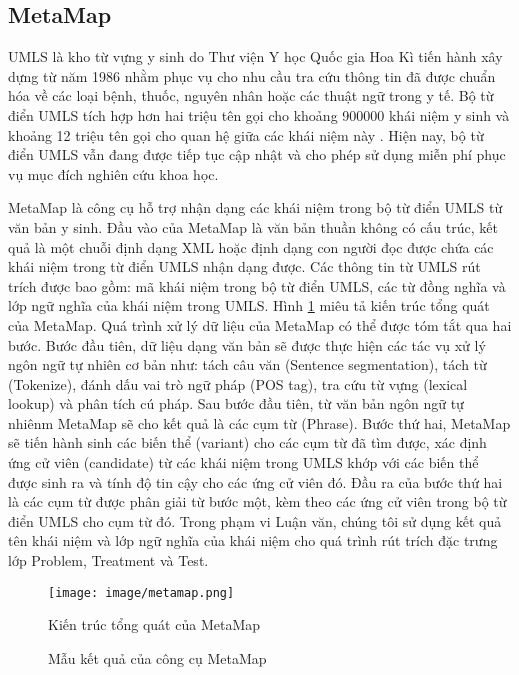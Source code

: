 \subsection*{MetaMap}
UMLS là kho từ vựng y sinh do Thư viện Y học Quốc gia Hoa Kì tiến hành xây dựng từ năm 1986 nhằm phục vụ cho nhu cầu tra cứu thông tin đã được chuẩn hóa về các loại bệnh, thuốc, nguyên nhân hoặc các thuật ngữ trong y tế. Bộ từ điển UMLS tích hợp hơn hai triệu tên gọi cho khoảng 900000 khái niệm y sinh và khoảng 12 triệu tên gọi cho quan hệ giữa các khái niệm này \cite{Olivier2004}. Hiện nay, bộ từ điển UMLS vẫn đang được tiếp tục cập nhật và cho phép sử dụng miễn phí phục vụ mục đích nghiên cứu khoa học.

MetaMap là công cụ hỗ trợ nhận dạng các khái niệm trong bộ từ điển UMLS từ văn bản y sinh. Đầu vào của MetaMap là văn bản thuần không có cấu trúc, kết quả là một chuỗi định dạng XML hoặc định dạng con người đọc được chứa các khái niệm trong từ điển UMLS nhận dạng được. Các thông tin từ UMLS rút trích được bao gồm: mã khái niệm trong bộ từ điển UMLS, các từ đồng nghĩa và lớp ngữ nghĩa của khái niệm trong UMLS. Hình \ref{metamapstructure} miêu tả kiến trúc tổng quát của MetaMap. Quá trình xử lý dữ liệu của MetaMap có thể được tóm tắt qua hai bước. Bước đầu tiên, dữ liệu dạng văn bản sẽ được thực hiện các tác vụ xử lý ngôn ngữ tự nhiên cơ bản như: tách câu văn (Sentence segmentation), tách từ (Tokenize), đánh dấu vai trò ngữ pháp (POS tag), tra cứu từ vựng (lexical lookup) và phân tích cú pháp. Sau bước đầu tiên, từ văn bản ngôn ngữ tự nhiênm MetaMap sẽ cho kết quả là các cụm từ (Phrase). Bước thứ hai, MetaMap sẽ tiến hành sinh các biến thể (variant) cho các cụm từ đã tìm được, xác định ứng cử viên (candidate) từ các khái niệm trong UMLS khớp với các biến thể được sinh ra và tính độ tin cậy cho các ứng cử viên đó. Đầu ra của bước thứ hai là các cụm từ được phân giải từ bước một, kèm theo các ứng cử viên trong bộ từ điển UMLS cho cụm từ đó. Trong phạm vi Luận văn, chúng tôi sử dụng kết quả tên khái niệm và lớp ngữ nghĩa của khái niệm cho quá trình rút trích đặc trưng lớp Problem, Treatment và Test.

\begin{figure}
\centering
\texttt{[image: image/metamap.png]}
\caption{Kiến trúc tổng quát của MetaMap\label{metamapstructure}}
\end{figure}

\begin{figure}[ht]
\centering
{}

\caption{Mẫu kết quả của công cụ MetaMap\label{metamapoutput}}
\end{figure}

